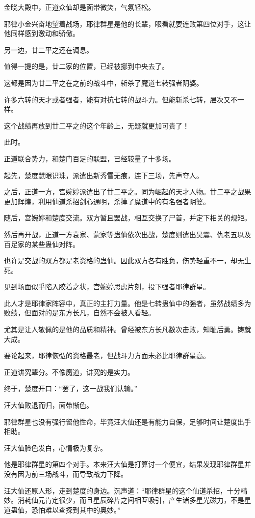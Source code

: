 \begin{this_body}
金晓大殿中，正道众仙却是面带微笑，气氛轻松。

耶律小金兴奋地望着战场，耶律群星是他的长辈，眼看就要连败第四位对手，这让他同样感到激动和骄傲。

另一边，廿二平之还在调息。

值得一提的是，廿二家的位置，已经被挪到中央去了。

这都是因为廿二平之在之前的战斗中，斩杀了魔道七转强者阴婆。

许多六转的天才或者强者，能有对抗七转的战斗力。但能斩杀七转，层次又不一样。

这个战绩再放到廿二平之的这个年龄上，无疑就更加可贵了！

此时。

正道联合势力，和楚门百足的联盟，已经较量了十多场。

起先，楚度慧眼识珠，派遣出新秀雪无痕，连下三场，先声夺人。

之后，正道一方，宫婉婷派遣出了廿二平之。同为崛起的天才人物。廿二平之战果更加辉煌，利用仙道杀招剑心通明，杀掉了魔道中的有名强者阴婆。

随后，宫婉婷和楚度交流。双方暂且罢战，相互交换了尸首，并定下相关的规矩。

然后再开战，正道一方袁家、蒙家等蛊仙依次出战，楚度则遣出昊震、仇老五以及百足家的某些蛊仙对阵。

也许是交战的双方都是老资格的蛊仙。因此双方各有胜负，伤势轻重不一，却无生死。

见到场面似乎陷入胶着之状，宫婉婷思虑片刻，投下强者耶律群星。

此人才是耶律家阵容中，真正的主打力量。他是七转蛊仙中的强者，虽然战绩多为败绩，但面对的是东方长凡，自然不会被人看轻。

尤其是让人敬佩的是他的品质和精神。曾经被东方长凡数次击败，知耻后勇。铸就大成。

要论起来，耶律恢弘的资格最老，但战斗力方面未必比耶律群星高。

正道讲究辈分。不像魔道，讲究的是实力。

终于，楚度开口：“罢了，这一战我们认输。”

汪大仙败退而归，面带惭色。

耶律群星也没有强行留他性命，毕竟汪大仙还是有能力自保，足够时间让楚度出手相助。

汪大仙脸色发白，心情极为复杂。

他是耶律群星的第四个对手。本来汪大仙是打算讨一个便宜，结果发现耶律群星并没有因为前三场战斗，而导致战力下降。

汪大仙还原人形，走到楚度的身边。沉声道：“耶律群星的这个仙道杀招，十分精妙。消耗仙元肯定很少，而且星辰碎片之间相互吸引，产生诸多星光磁力，不是星道蛊仙，恐怕难以查探到其中的奥妙。”


\end{this_body}
